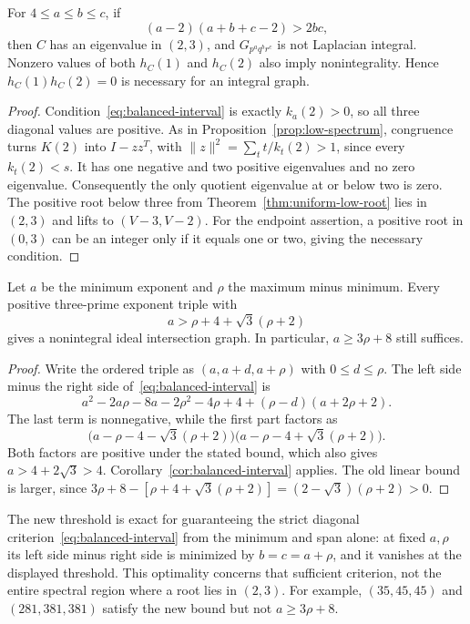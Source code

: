 \begin{corollary}
\label{cor:balanced-interval}
For $4\leq a\leq b\leq c$, if
\begin{equation}
\label{eq:balanced-interval}
(a-2)(a+b+c-2)>2bc,
\end{equation}
then $C$ has an eigenvalue in $(2,3)$, and $G_{p^a q^b r^c}$ is not
Laplacian integral. Nonzero values of both $h_C(1)$ and $h_C(2)$ also
imply nonintegrality. Hence $h_C(1)h_C(2)=0$ is necessary for an integral graph.
\end{corollary}

\begin{proof}
Condition~\eqref{eq:balanced-interval} is exactly $k_a(2)>0$, so all
three diagonal values are positive. As in
Proposition~\ref{prop:low-spectrum}, congruence turns $K(2)$ into
$I-zz^T$, with $\|z\|^2=\sum_t t/k_t(2)>1$, since every $k_t(2)<s$.
It has one negative and two positive eigenvalues and no zero eigenvalue.
Consequently the only quotient eigenvalue at or below two is zero.
The positive root below three from Theorem~\ref{thm:uniform-low-root}
lies in $(2,3)$ and lifts to $(V-3,V-2)$.
For the endpoint assertion, a positive root in $(0,3)$ can be an integer
only if it equals one or two, giving the necessary condition.
\end{proof}

\begin{corollary}
\label{cor:balanced-span}
Let $a$ be the minimum exponent and $\rho$ the maximum minus minimum.
Every positive three-prime exponent triple with
\[
a>\rho+4+\sqrt3(\rho+2)
\]
gives a nonintegral ideal intersection graph. In particular,
$a\geq3\rho+8$ still suffices.
\end{corollary}

\begin{proof}
Write the ordered triple as $(a,a+d,a+\rho)$ with $0\leq d\leq\rho$.
The left side minus the right side of~\eqref{eq:balanced-interval} is
\[
a^2-2a\rho-8a-2\rho^2-4\rho+4+(\rho-d)(a+2\rho+2).
\]
The last term is nonnegative, while the first part factors as
\[
\bigl(a-\rho-4-\sqrt3(\rho+2)\bigr)
\bigl(a-\rho-4+\sqrt3(\rho+2)\bigr).
\]
Both factors are positive under the stated bound, which also gives
$a>4+2\sqrt3>4$. Corollary~\ref{cor:balanced-interval} applies.
The old linear bound is larger, since
$3\rho+8-[\rho+4+\sqrt3(\rho+2)]=(2-\sqrt3)(\rho+2)>0$.
\end{proof}

The new threshold is exact for guaranteeing the strict diagonal
criterion~\eqref{eq:balanced-interval} from the minimum and span alone:
at fixed $a,\rho$ its left side minus right side is minimized by
$b=c=a+\rho$, and it vanishes at the displayed threshold.
This optimality concerns that sufficient criterion, not the entire
spectral region where a root lies in $(2,3)$. For example,
$(35,45,45)$ and $(281,381,381)$ satisfy the new bound but not
$a\geq3\rho+8$.


